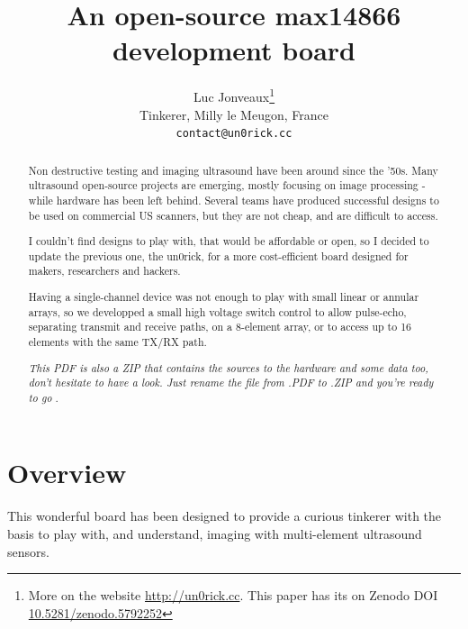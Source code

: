 \documentclass{article}
\title{An open-source max14866 development board}
\author{
  Luc Jonveaux\thanks{More on the website \url{http://un0rick.cc}. This paper has its on Zenodo DOI  \href{http://doi.org/10.5281/zenodo.5792252}{10.5281/zenodo.5792252} } \\
  Tinkerer, Milly le Meugon, France\\
  \texttt{contact@un0rick.cc} \\
}
\begin{document}
\maketitle

\begin{abstract}
Non destructive testing and imaging ultrasound have been around since the ’50s. Many ultrasound open-source projects are emerging, mostly focusing on image processing - while hardware has been left behind. Several teams have produced successful designs to be used on commercial US scanners, but they are not cheap, and are difficult to access. 

I couldn’t find designs to play with, that would be affordable or open, so I decided to update the previous one, the un0rick, for a more cost-efficient board designed for makers, researchers and hackers.

Having a single-channel device was not enough to play with small linear or annular arrays, so we developped a small high voltage switch control to allow pulse-echo, separating transmit and receive paths, on a 8-element array, or to access up to 16 elements with the same TX/RX path. 

\emph{ This PDF is also a ZIP that contains the sources to the hardware and some data too, don't hesitate to have a look. Just rename the file from .PDF to .ZIP and you're ready to go }.
\end{abstract}






\section{Overview}

This wonderful board has been designed to provide a curious tinkerer with the basis to play with, and understand, imaging with multi-element ultrasound sensors.
\end{document}
